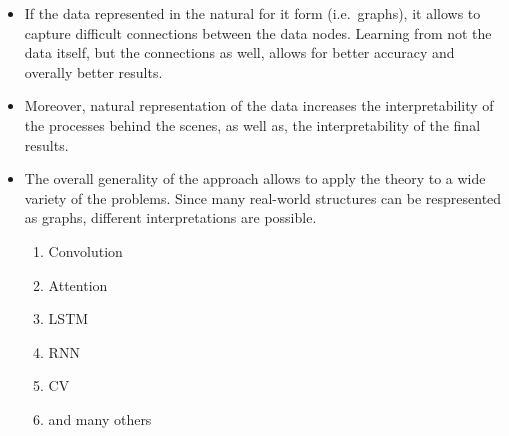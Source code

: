\begin{itemize}
      \item If the data represented in the natural for it form (i.e.~graphs), it allows to
            capture difficult connections between the data nodes. Learning from not the
            data itself, but the connections as well, allows for better accuracy and
            overally better results.
      \item Moreover, natural representation of the data increases the interpretability of
            the processes behind the scenes, as well as, the interpretability of the final
            results.
      \item The overall generality of the approach allows to apply the theory to a wide
            variety of the problems. Since many real-world structures can be respresented
            as graphs, different interpretations are possible.
            \begin{enumerate}
                  \item Convolution
                  \item Attention
                  \item LSTM
                  \item RNN
                  \item CV
                  \item and many others
            \end{enumerate}
\end{itemize}
